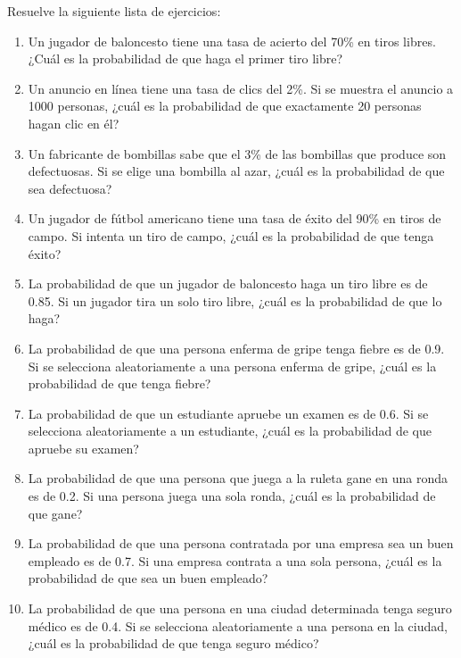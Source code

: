 \begin{Ejer}
Resuelve la siguiente lista de ejercicios:

\begin{enumerate}
    \item Un jugador de baloncesto tiene una tasa de acierto del 70\% en tiros libres. ¿Cuál es la probabilidad de que haga el primer tiro libre?

    \item Un anuncio en línea tiene una tasa de clics del 2\%. Si se muestra el anuncio a 1000 personas, ¿cuál es la probabilidad de que exactamente 20 personas hagan clic en él?

    \item Un fabricante de bombillas sabe que el 3\% de las bombillas que produce son defectuosas. Si se elige una bombilla al azar, ¿cuál es la probabilidad de que sea defectuosa?

    \item Un jugador de fútbol americano tiene una tasa de éxito del 90\% en tiros de campo. Si intenta un tiro de campo, ¿cuál es la probabilidad de que tenga éxito?

    \item La probabilidad de que un jugador de baloncesto haga un tiro libre es de 0.85. Si un jugador tira un solo tiro libre, ¿cuál es la probabilidad de que lo haga?

    \item La probabilidad de que una persona enferma de gripe tenga fiebre es de 0.9. Si se selecciona aleatoriamente a una persona enferma de gripe, ¿cuál es la probabilidad de que tenga fiebre?

    \item La probabilidad de que un estudiante apruebe un examen es de 0.6. Si se selecciona aleatoriamente a un estudiante, ¿cuál es la probabilidad de que apruebe su examen?

    \item La probabilidad de que una persona que juega a la ruleta gane en una ronda es de 0.2. Si una persona juega una sola ronda, ¿cuál es la probabilidad de que gane?

    \item La probabilidad de que una persona contratada por una empresa sea un buen empleado es de 0.7. Si una empresa contrata a una sola persona, ¿cuál es la probabilidad de que sea un buen empleado?

    \item La probabilidad de que una persona en una ciudad determinada tenga seguro médico es de 0.4. Si se selecciona aleatoriamente a una persona en la ciudad, ¿cuál es la probabilidad de que tenga seguro médico?

\end{enumerate}
\end{Ejer}


